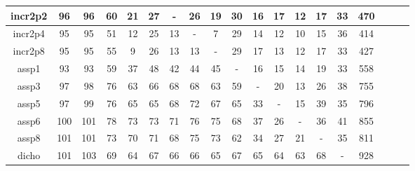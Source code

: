 {{\begin{longtable}{@{\extracolsep{\fill}}|*{19}{c|}}
\hline
incr2p2&96&96&60&21&27&{-}&26&19&30&16&17&12&17&33&470\\
\hline
incr2p4&95&95&51&12&25&13&{-}&7&29&14&12&10&15&36&414\\
\hline
incr2p8&95&95&55&9&26&13&13&{-}&29&17&13&12&17&33&427\\
\hline
assp1&93&93&59&37&48&42&44&45&{-}&16&15&14&19&33&558\\
\hline
assp3&97&98&76&63&66&68&68&63&59&{-}&20&13&26&38&755\\
\hline
assp5&97&99&76&65&65&68&72&67&65&33&{-}&15&39&35&796\\
\hline
assp6&100&101&78&73&73&71&76&75&68&37&26&{-}&36&41&855\\
\hline
assp8&101&101&73&70&71&68&75&73&62&34&27&21&{-}&35&811\\
\hline
dicho&101&103&69&64&67&66&66&65&67&65&64&63&68&{-}&928\\
\hline
\end{longtable}}}